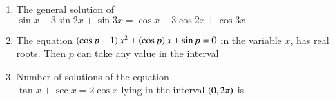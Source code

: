 \documentclass[journal,12pt,twocolumn]{IEEEtran}
\theoremstyle{remark}
\begin{document}
\begin{enumerate}
    \item The general solution of \\$\sin{x}-3\sin{2x} + \sin{3x} = \cos{x}-3\cos{2x} + \cos{3x}$
        
        \hfill{}
        \begin{enumerate}[label={(\alph*)}]
        \end{enumerate}


    \item The equation $\left(\cos{p}-1\right)x^2+\left(\cos{p}\right)x+\sin{p}=0$ in the variable $x$, has real roots. Then $p$ can take any value in the interval
        
        \hfill{}
        \begin{enumerate}[label={(\alph*)}]

        \end{enumerate}

    \item Number of solutions of the equation \\$\tan{x}+\sec{x} = 2\cos{x}$ lying in the interval $\left(0, 2\pi\right)$ is
        

\end{enumerate}
\end{document}
